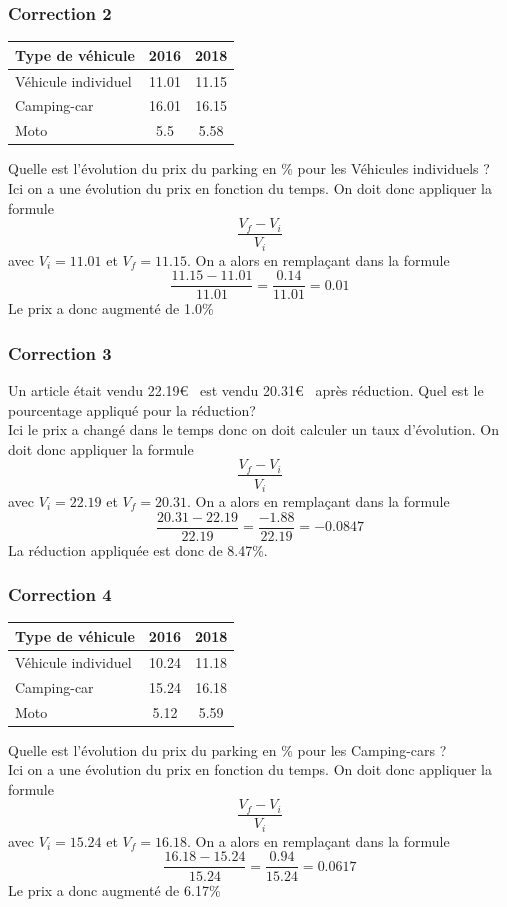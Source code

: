 \documentclass[15pt, mathserif]{beamer}
\begin{document}
\begin{frame}
\vspace{-10mm}
	\frametitle{Correction 2}
 
 \begin{center} 
 \begin{tabular}{|C{3cm}|c|c|} 
 \hline 
 {\small Type de véhicule} & {\small 2016} & {\small 2018} \\ 
 \hline 
 {\small Véhicule individuel} & 11.01& 11.15\\ 
 \hline 
 {\small Camping-car } & 16.01& 16.15\\ 
 \hline 
 {\small Moto } & 5.5& 5.58\\ 
 \hline 
 \end{tabular} 
\end{center} 
  {\small Quelle est l'évolution du prix du parking en \% pour les Véhicules individuels ? \\ Ici on a une évolution du prix en fonction du temps. On doit donc appliquer la formule} $$\dfrac{V_f-V_i}{V_i}$$ avec $V_i =11.01$ et $V_f=11.15$. {\small On a alors en remplaçant dans la formule} $$\dfrac{11.15-11.01}{11.01}= \dfrac{0.14}{11.01} = 0.01$$ {\small Le prix a donc augmenté de  1.0\% } \end{frame}


\begin{frame}
\vspace{-10mm}
	\frametitle{Correction 3}
Un article était vendu 22.19\euro ~ est vendu 20.31\euro ~ après réduction. Quel est le pourcentage appliqué pour la réduction? \\ Ici le prix a changé dans le temps donc on doit calculer un taux d'évolution. On doit donc appliquer la formule $$\dfrac{V_f-V_i}{V_i}$$ avec $V_i =22.19$ et $V_f=20.31$. On a alors en remplaçant dans la formule $$\dfrac{20.31-22.19}{22.19}= \dfrac{-1.88}{22.19}=-0.0847$$ La réduction appliquée est donc de 8.47\%.\end{frame}


\begin{frame}
\vspace{-10mm}
	\frametitle{Correction 4}
 
 \begin{center} 
 \begin{tabular}{|C{3cm}|c|c|} 
 \hline 
 {\small Type de véhicule} & {\small 2016} & {\small 2018} \\ 
 \hline 
 {\small Véhicule individuel} & 10.24& 11.18\\ 
 \hline 
 {\small Camping-car } & 15.24& 16.18\\ 
 \hline 
 {\small Moto } & 5.12& 5.59\\ 
 \hline 
 \end{tabular} 
\end{center} 
  {\small Quelle est l'évolution du prix du parking en \% pour les Camping-cars ?\\ Ici on a une évolution du prix en fonction du temps. On doit donc appliquer la formule} $$\dfrac{V_f-V_i}{V_i}$$ avec $V_i =15.24$ et $V_f=16.18$. On a alors en remplaçant dans la formule $$\dfrac{16.18-15.24}{15.24}= \dfrac{0.94}{15.24} = 0.0617$$ {\small Le prix a donc augmenté de  6.17\% } \end{frame}
\end{document}

